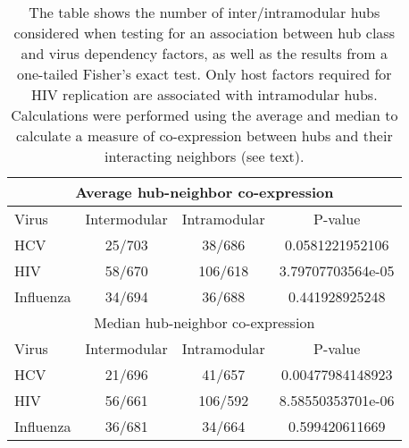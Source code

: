 \begin{table}\footnotesize
\begin{center}
\begin{tabular}{|l|c|c|c|}
\hline
\multicolumn{4}{|c|}{Average hub-neighbor co-expression}\\
\hline
Virus & Intermodular & Intramodular & P-value \\
\hline
HCV &  25/703 & 38/686 & 0.0581221952106       \\
HIV &   58/670 &  106/618 & 3.79707703564e-05    \\
Influenza & 34/694 & 36/688&  0.441928925248 \\
\hline
\hline
\multicolumn{4}{|c|}{Median hub-neighbor co-expression}\\
\hline
Virus & Intermodular & Intramodular & P-value \\
\hline
HCV &   21/696  & 41/657  & 0.00477984148923   \\ 
HIV & 56/661  & 106/592 & 8.58550353701e-06\\
Influenza & 36/681  & 34/664  & 0.599420611669\\
\hline
  \end{tabular}
\end{center}
\caption[Fisher's test for virus hub dependency factor
  preference]{\small The table shows the number of inter/intramodular
  hubs considered when testing for an association between hub class
  and virus dependency factors, as well as the results from a
  one-tailed Fisher's exact test. Only host factors required for HIV
  replication are associated with intramodular hubs. Calculations were
  performed using the average and median to calculate a measure of
  co-expression between hubs and their interacting neighbors (see
  text). \label{tbl:sysBio:rnaiFisher}}
\end{table}
